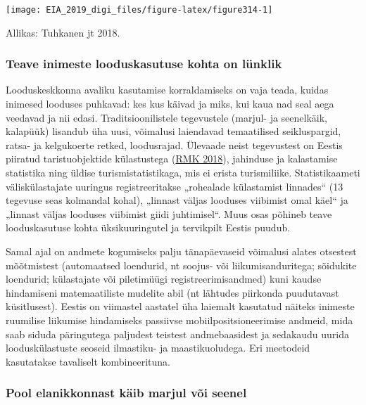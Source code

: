 \documentclass[estonian,]{article}
\begin{document}
\begin{center}\texttt{[image: EIA\_2019\_digi\_files/figure-latex/figure314-1]} \end{center}

\begin{imgsource}
{Allikas:} Tuhkanen jt 2018.
\end{imgsource}

\hypertarget{teave-inimeste-looduskasutuse-kohta-on-luxfcnklik}{%
\subsubsection*{Teave inimeste looduskasutuse kohta on lünklik}\label{teave-inimeste-looduskasutuse-kohta-on-luxfcnklik}}

Looduskeskkonna avaliku kasutamise korraldamiseks on vaja teada, kuidas inimesed looduses puhkavad: kes kus käivad ja miks, kui kaua nad seal aega veedavad ja nii edasi. Traditsioonilistele tegevustele (marjul- ja seenelkäik, kalapüük) lisandub üha uusi, võimalusi laiendavad temaatilised seikluspargid, ratsa- ja kelgukoerte retked, loodusrajad. Ülevaade neist tegevustest on Eestis piiratud taristuobjektide külastustega (\protect\hyperlink{RMK2018}{RMK 2018}), jahinduse ja kalastamise statistika ning üldise turismistatistikaga, mis ei erista turismiliike. Statistikaameti väliskülastajate uuringus registreeritakse „rohealade külastamist linnades`` (13 tegevuse seas kolmandal kohal), „linnast väljas looduses viibimist omal käel`` ja „linnast väljas looduses viibimist giidi juhtimisel``. Muus osas põhineb teave looduskasutuse kohta üksikuuringutel ja tervikpilt Eestis puudub.

Samal ajal on andmete kogumiseks palju tänapäevaseid võimalusi alates otsestest mõõtmistest (automaatsed loendurid, nt soojus- või liikumisanduritega; sõidukite loendurid; külastajate või piletimüügi registreerimisandmed) kuni kaudse hindamiseni matemaatiliste mudelite abil (nt lähtudes piirkonda puudutavast küsitlusest). Eestis on viimastel aastatel üha laiemalt kasutatud näiteks inimeste ruumilise liikumise hindamiseks passiivse mobiilpositsioneerimise andmeid, mida saab siduda päringutega paljudest teistest andmebaasidest ja sedakaudu uurida looduskülastuste seoseid ilmastiku- ja maastikuoludega. Eri meetodeid kasutatakse tavaliselt kombineerituna.

\hypertarget{pool-elanikkonnast-kuxe4ib-marjul-vuxf5i-seenel}{%
\subsubsection*{Pool elanikkonnast käib marjul või seenel}\label{pool-elanikkonnast-kuxe4ib-marjul-vuxf5i-seenel}}
\end{document}
